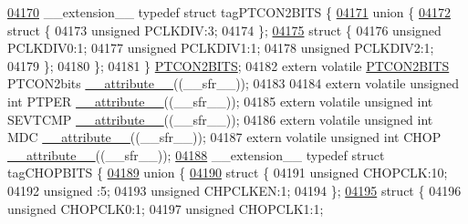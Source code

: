 \begin{DoxyCode}
\hypertarget{a00009_source_l04170}{}\hyperlink{a00008}{04170} \_\_extension\_\_ \textcolor{keyword}{typedef} \textcolor{keyword}{struct }tagPTCON2BITS \{
\hypertarget{a00009_source_l04171}{}\hyperlink{a00009}{04171}   \textcolor{keyword}{union }\{
\hypertarget{a00009_source_l04172}{}\hyperlink{a00009}{04172}     \textcolor{keyword}{struct }\{
04173       \textcolor{keywordtype}{unsigned} PCLKDIV:3;
04174     \};
\hypertarget{a00009_source_l04175}{}\hyperlink{a00009}{04175}     \textcolor{keyword}{struct }\{
04176       \textcolor{keywordtype}{unsigned} PCLKDIV0:1;
04177       \textcolor{keywordtype}{unsigned} PCLKDIV1:1;
04178       \textcolor{keywordtype}{unsigned} PCLKDIV2:1;
04179     \};
04180   \};
04181 \} \hyperlink{a00008_df/d37/a00652}{PTCON2BITS};
04182 \textcolor{keyword}{extern} \textcolor{keyword}{volatile} \hyperlink{a00008_df/d37/a00652}{PTCON2BITS} PTCON2bits \hyperlink{a00009_a493c46f03454991ccc5aa7a6e1dfb2a7}{\_\_attribute\_\_}((\_\_sfr\_\_));
04183 
04184 \textcolor{keyword}{extern} \textcolor{keyword}{volatile} \textcolor{keywordtype}{unsigned} \textcolor{keywordtype}{int}  PTPER \hyperlink{a00009_a493c46f03454991ccc5aa7a6e1dfb2a7}{\_\_attribute\_\_}((\_\_sfr\_\_));
04185 \textcolor{keyword}{extern} \textcolor{keyword}{volatile} \textcolor{keywordtype}{unsigned} \textcolor{keywordtype}{int}  SEVTCMP \hyperlink{a00009_a493c46f03454991ccc5aa7a6e1dfb2a7}{\_\_attribute\_\_}((\_\_sfr\_\_));
04186 \textcolor{keyword}{extern} \textcolor{keyword}{volatile} \textcolor{keywordtype}{unsigned} \textcolor{keywordtype}{int}  MDC \hyperlink{a00009_a493c46f03454991ccc5aa7a6e1dfb2a7}{\_\_attribute\_\_}((\_\_sfr\_\_));
04187 \textcolor{keyword}{extern} \textcolor{keyword}{volatile} \textcolor{keywordtype}{unsigned} \textcolor{keywordtype}{int}  CHOP \hyperlink{a00009_a493c46f03454991ccc5aa7a6e1dfb2a7}{\_\_attribute\_\_}((\_\_sfr\_\_));
\hypertarget{a00009_source_l04188}{}\hyperlink{a00008}{04188} \_\_extension\_\_ \textcolor{keyword}{typedef} \textcolor{keyword}{struct }tagCHOPBITS \{
\hypertarget{a00009_source_l04189}{}\hyperlink{a00009}{04189}   \textcolor{keyword}{union }\{
\hypertarget{a00009_source_l04190}{}\hyperlink{a00009}{04190}     \textcolor{keyword}{struct }\{
04191       \textcolor{keywordtype}{unsigned} CHOPCLK:10;
04192       \textcolor{keywordtype}{unsigned} :5;
04193       \textcolor{keywordtype}{unsigned} CHPCLKEN:1;
04194     \};
\hypertarget{a00009_source_l04195}{}\hyperlink{a00009}{04195}     \textcolor{keyword}{struct }\{
04196       \textcolor{keywordtype}{unsigned} CHOPCLK0:1;
04197       \textcolor{keywordtype}{unsigned} CHOPCLK1:1;

\end{DoxyCode}
